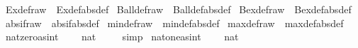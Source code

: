 \begin{isabellebody}
\isanewline
%
\endisadelimproof
\isanewline
{}\isamarkupfalse%
\ Ex{}{\isacharunderscore}{\kern0pt}def{\isacharunderscore}{\kern0pt}raw\ {\isacharequal}{\kern0pt}\ Ex{}{\isacharunderscore}{\kern0pt}def{\isacharbrackleft}{\kern0pt}abs{\isacharunderscore}{\kern0pt}def{\isacharbrackright}{\kern0pt}\isanewline
{}\isamarkupfalse%
\ Ball{\isacharunderscore}{\kern0pt}def{\isacharunderscore}{\kern0pt}raw\ {\isacharequal}{\kern0pt}\ Ball{\isacharunderscore}{\kern0pt}def{\isacharbrackleft}{\kern0pt}abs{\isacharunderscore}{\kern0pt}def{\isacharbrackright}{\kern0pt}\isanewline
{}\isamarkupfalse%
\ Bex{\isacharunderscore}{\kern0pt}def{\isacharunderscore}{\kern0pt}raw\ {\isacharequal}{\kern0pt}\ Bex{\isacharunderscore}{\kern0pt}def{\isacharbrackleft}{\kern0pt}abs{\isacharunderscore}{\kern0pt}def{\isacharbrackright}{\kern0pt}\isanewline
{}\isamarkupfalse%
\ abs{\isacharunderscore}{\kern0pt}if{\isacharunderscore}{\kern0pt}raw\ {\isacharequal}{\kern0pt}\ abs{\isacharunderscore}{\kern0pt}if{\isacharbrackleft}{\kern0pt}abs{\isacharunderscore}{\kern0pt}def{\isacharbrackright}{\kern0pt}\isanewline
{}\isamarkupfalse%
\ min{\isacharunderscore}{\kern0pt}def{\isacharunderscore}{\kern0pt}raw\ {\isacharequal}{\kern0pt}\ min{\isacharunderscore}{\kern0pt}def{\isacharbrackleft}{\kern0pt}abs{\isacharunderscore}{\kern0pt}def{\isacharbrackright}{\kern0pt}\isanewline
{}\isamarkupfalse%
\ max{\isacharunderscore}{\kern0pt}def{\isacharunderscore}{\kern0pt}raw\ {\isacharequal}{\kern0pt}\ max{\isacharunderscore}{\kern0pt}def{\isacharbrackleft}{\kern0pt}abs{\isacharunderscore}{\kern0pt}def{\isacharbrackright}{\kern0pt}\isanewline
\isanewline
{}\isamarkupfalse%
\ nat{\isacharunderscore}{\kern0pt}zero{\isacharunderscore}{\kern0pt}as{\isacharunderscore}{\kern0pt}int{\isacharcolon}{\kern0pt}\isanewline
\ \ {\isachardoublequoteopen}{}\ {\isacharequal}{\kern0pt}\ nat\ {}{\isachardoublequoteclose}\isanewline
%
\isadelimproof
\ \ %
\endisadelimproof
%
\isatagproof
{}\isamarkupfalse%
\ simp%
\endisatagproof
{\isafoldproof}%
%
\isadelimproof
\isanewline
%
\endisadelimproof
\isanewline
{}\isamarkupfalse%
\ nat{\isacharunderscore}{\kern0pt}one{\isacharunderscore}{\kern0pt}as{\isacharunderscore}{\kern0pt}int{\isacharcolon}{\kern0pt}\isanewline
\ \ {\isachardoublequoteopen}{}\ {\isacharequal}{\kern0pt}\ nat\ {}{\isachardoublequoteclose}\isanewline
%
\isadelimproof
\ \ %
\endisadelimproof
%
\isatagproof

\end{isabellebody}
